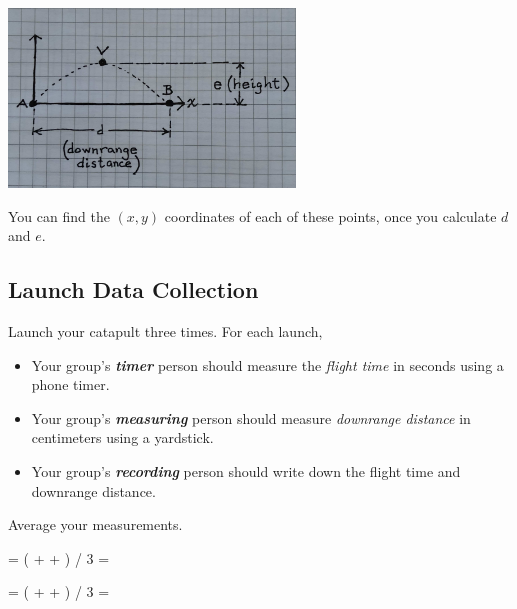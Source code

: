 \begin{center}
    \includegraphics[width=3in]{../AVB.jpg}
\end{center}

You can find the $(x, y)$ coordinates of each of these points, 
once you calculate $d$ and $e$.





\subsection{Launch Data Collection}

Launch your catapult three times.
For each launch,
\begin{itemize}[nosep]
    \item Your group's {\bfseries\itshape timer} person should 
        measure the {\itshape flight time} in seconds using a phone timer.
    \item Your group's {\bfseries\itshape measuring} person should 
        measure {\itshape downrange distance} 
        in centimeters using a yardstick.
    \item Your group's {\bfseries\itshape recording} person should 
        write down the flight time and downrange distance.
\end{itemize}

Average your measurements.

\begin{tcolorbox}[colback=\myFillinColor,ams align]
     = 
    ( 
         +   + 
    ) / 3 
    = 
\end{tcolorbox}
\begin{tcolorbox}[colback=\myFillinColor,ams align]
    = 
    (  +   + ) / 3 
    = 
\end{tcolorbox}
    



